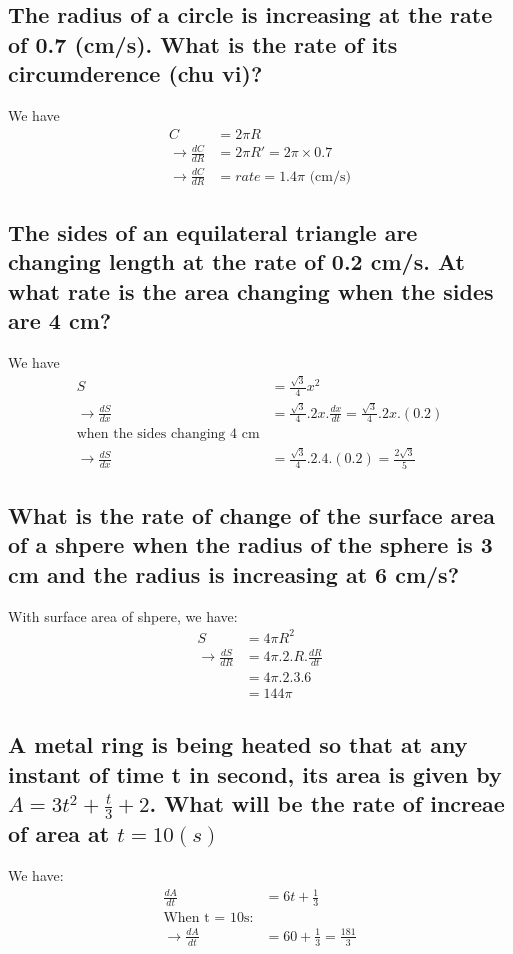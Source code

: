 \documentclass{article}
\begin{document}
\begin{multicols}{2}

\subsection{The radius of a circle is increasing at the rate of 0.7 (cm/s). What is the rate of its circumderence (chu vi)?}
We have
\begin{align*}
    C &= 2\pi R \\
    \rightarrow \frac{dC}{dR} &= 2\pi R' = 2\pi \times 0.7\\
    \rightarrow \frac{dC}{dR} &= rate = 1.4\pi \text{ (cm/s)}
\end{align*}

\subsection{The sides of an equilateral triangle are changing length at the rate of 0.2 cm/s. At what rate is the area changing when the sides are 4 cm?}
We have
\begin{align*}
    S &= \frac{\sqrt{3}}{4}x^2 \\
    \rightarrow \frac{dS}{dx} &= \frac{\sqrt{3}}{4}.2x.\frac{dx}{dt} = \frac{\sqrt{3}}{4}.2x.(0.2) \\
    \text{when the sides changing 4 cm} \\
    \rightarrow \frac{dS}{dx} &= \frac{\sqrt{3}}{4}.2.4.(0.2) = \frac{2\sqrt{3}}{5}
\end{align*}


\subsection{What is the rate of change of the surface area of a shpere when the radius of the sphere is 3 cm and the radius is increasing at 6 cm/s?}
With surface area of shpere, we have:
\begin{align*}
    S &= 4\pi R^2 \\
    \rightarrow \frac{dS}{dR} &= 4\pi .2.R.\frac{dR}{dt} \\
                            &= 4\pi .2.3.6 \\
                            &= 144\pi
\end{align*}


\subsection{A metal ring is being heated so that at any instant of time t in second, its area is given by $A = 3t^2 + \frac{t}{3} + 2$. What will be the rate of increae of area at $t = 10 (s)$}
We have:
\begin{align*}
    \frac{dA}{dt} &= 6t + \frac{1}{3} \\
    \text{When t = 10s:} \\
    \rightarrow \frac{dA}{dt} &= 60 + \frac{1}{3} = \frac{181}{3}
\end{align*}



\end{multicols}
\end{document}
